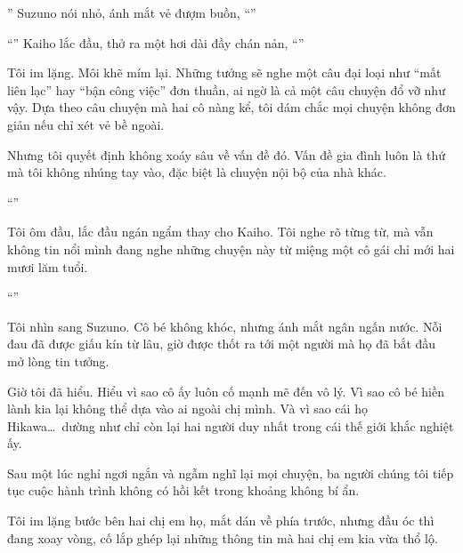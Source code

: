 \documentclass[../main.tex]{subfiles}
\begin{document}
'' Suzuno nói nhỏ, ánh mắt vẻ đượm buồn, ``''

``'' Kaiho lắc đầu, thở ra một hơi dài đầy chán nản, ``''

Tôi im lặng. Môi khẽ mím lại. Những tưởng sẽ nghe một câu đại loại như ``mất liên lạc'' hay ``bận công việc'' đơn thuần, ai ngờ là cả một câu chuyện đổ vỡ như vậy. Dựa theo câu chuyện mà hai cô nàng kể, tôi dám chắc mọi chuyện không đơn giản nếu chỉ xét vẻ bề ngoài.

Nhưng tôi quyết định không xoáy sâu về vấn đề đó. Vấn đề gia đình luôn là thứ mà tôi không nhúng tay vào, đặc biệt là chuyện nội bộ của nhà khác.

``''

Tôi ôm đầu, lắc đầu ngán ngẩm thay cho Kaiho. Tôi nghe rõ từng từ, mà vẫn không tin nổi mình đang nghe những chuyện này từ miệng một cô gái chỉ mới hai mươi lăm tuổi.

``''

Tôi nhìn sang Suzuno. Cô bé không khóc, nhưng ánh mắt ngân ngấn nước. Nỗi đau đã được giấu kín từ lâu, giờ được thốt ra tới một người mà họ đã bắt đầu mở lòng tin tưởng.

Giờ tôi đã hiểu. Hiểu vì sao cô ấy luôn cố mạnh mẽ đến vô lý. Vì sao cô bé hiền lành kia lại không thể dựa vào ai ngoài chị mình. Và vì sao cái họ Hikawa\dots\ dường như chỉ còn lại hai người duy nhất trong cái thế giới khắc nghiệt ấy.

\ct

Sau một lúc nghỉ ngơi ngắn và ngẫm nghĩ lại mọi chuyện, ba người chúng tôi tiếp tục cuộc hành trình không có hồi kết trong khoảng không bí ẩn.

Tôi im lặng bước bên hai chị em họ, mắt dán về phía trước, nhưng đầu óc thì đang xoay vòng, cố lắp ghép lại những thông tin mà hai chị em kia vừa thổ lộ.
\end{document}
